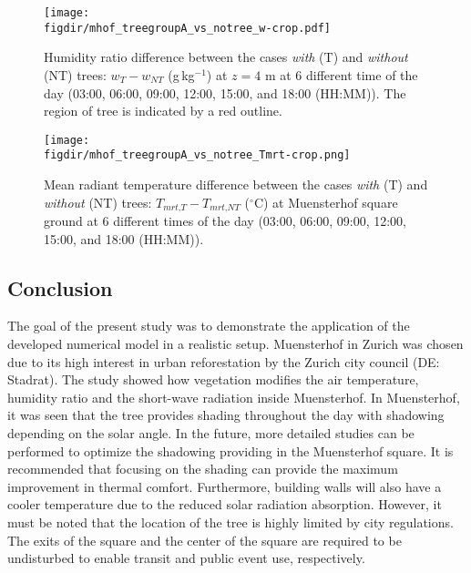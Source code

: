 	\begin{figure}[p]
		\centering
		\texttt{[image: \\figdir/mhof\_treegroupA\_vs\_notree\_w-crop.pdf]}
		\caption{Humidity ratio difference between the cases \textit{with} (T) and \textit{without} (NT) trees: $w_{T}-w_{\textit{NT}}$ (g\,kg$^{-1}$) at $z=4$ m at 6 different time of the day (03:00, 06:00, 09:00, 12:00, 15:00, and 18:00 (HH:MM)). The region of tree is indicated by a red outline.}
		\label{fig:mwdiff_muensterhof}
	\end{figure}

		
	\begin{figure}[p]
		\centering
		\texttt{[image: \\figdir/mhof\_treegroupA\_vs\_notree\_Tmrt-crop.png]}
		\caption{Mean radiant temperature difference between the cases \textit{with} (T) and \textit{without} (NT) trees: $T_{\textit{mrt,T}}-T_{\textit{mrt,NT}}$ ($^{\circ}$C) at Muensterhof square ground at 6 different times of the day (03:00, 06:00, 09:00, 12:00, 15:00, and 18:00 (HH:MM)).}
		\label{fig:mTmrtdiff_muensterhof}
	\end{figure}


\subsection{Conclusion}

The goal of the present study was to demonstrate the application of the developed numerical model in a realistic setup. Muensterhof in Zurich was chosen due to its high interest in urban reforestation by the Zurich city council (DE: Stadrat). The study showed how vegetation modifies the air temperature, humidity ratio and the short-wave radiation inside Muensterhof. In Muensterhof, it was seen that the tree provides shading throughout the day with shadowing depending on the solar angle. In the future, more detailed studies can be performed to optimize the shadowing providing in the Muensterhof square. It is recommended that focusing on the shading can provide the maximum improvement in thermal comfort. Furthermore, building walls will also have a cooler temperature due to the reduced solar radiation absorption. However, it must be noted that the location of the tree is highly limited by city regulations. The exits of the square and the center of the square are required to be undisturbed to enable transit and public event use, respectively. 

